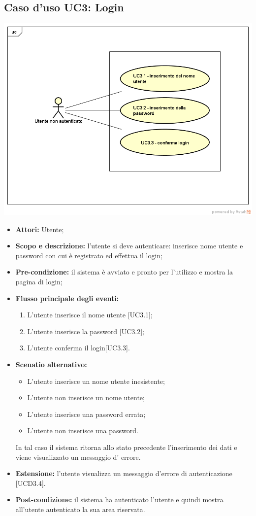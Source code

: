 \subsection{Caso d'uso UC3: Login}
\begin{center}
	\includegraphics[scale=0.5]{UML/UC3-login.png}
\end{center}
\begin{itemize}
	\item \textbf{Attori:} Utente;
	\item \textbf{Scopo e descrizione:} l'utente si deve autenticare: inserisce nome utente e password con cui è registrato ed effettua il login;
	\item \textbf{Pre-condizione:} il sistema è avviato e pronto per l'utilizzo e mostra la pagina di login;
	\item \textbf{Flusso principale degli eventi:}
	\begin{enumerate}
		\item L'utente inserisce il nome utente [UC3.1];
		\item L'utente inserisce la password [UC3.2];
		\item L'utente conferma il login[UC3.3].
	\end{enumerate}
	\item \textbf{Scenatio alternativo:}
	\begin{itemize}
		\item L'utente inserisce un nome utente inesistente;
		\item L'utente non inserisce un nome utente;
		\item L'utente inserisce una password errata;
		\item L'utente non inserisce una password.
	\end{itemize}
	In tal caso il sistema ritorna allo stato precedente l'inserimento dei dati e viene visualizzato un messaggio d' errore.
	\item \textbf{Estensione:} l'utente visualizza un messaggio d'errore di autenticazione [UCD3.4].
	\item \textbf{Post-condizione:} il sistema ha autenticato l'utente e quindi mostra all'utente autenticato la sua area riservata.
\end{itemize}

